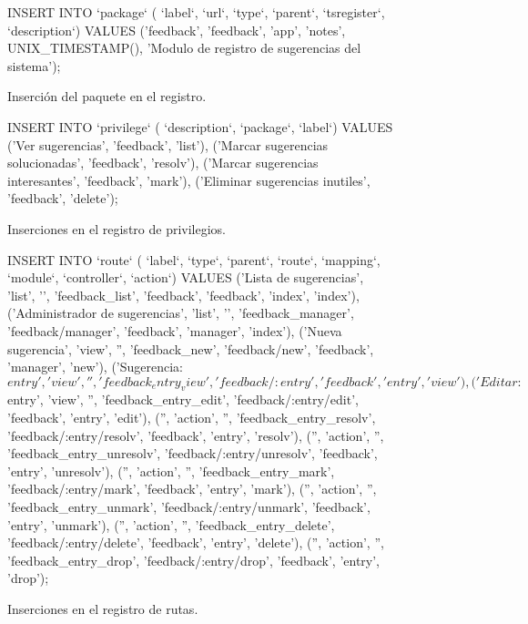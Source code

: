 \begin{figure}
\centering
\begin{SQL}
INSERT INTO `package` (
    `label`, `url`, `type`, `parent`,
    `tsregister`, `description`)
VALUES
    ('feedback', 'feedback', 'app', 'notes',
    UNIX_TIMESTAMP(),
   'Modulo de registro de sugerencias del sistema');
\end{SQL}
\caption{Inserción del paquete en el registro.}
\label{code2}
\end{figure}

\begin{figure}
\centering
\begin{SQL}
INSERT INTO `privilege` (
    `description`, `package`, `label`)
VALUES
    ('Ver sugerencias',                 'feedback', 'list'),
    ('Marcar sugerencias solucionadas', 'feedback', 'resolv'),
    ('Marcar sugerencias interesantes', 'feedback', 'mark'),
    ('Eliminar sugerencias inutiles',   'feedback', 'delete');
\end{SQL}
\caption{Inserciones en el registro de privilegios.}
\label{code3}
\end{figure}

\begin{figure}
\centering
\begin{SQL}
INSERT INTO `route` (
    `label`,
    `type`, `parent`, `route`,
    `mapping`,
    `module`, `controller`, `action`)
VALUES
    ('Lista de sugerencias',
     'list', '', 'feedback_list',
     'feedback',
     'feedback', 'index',   'index'),
    ('Administrador de sugerencias',
     'list', '', 'feedback_manager',
     'feedback/manager',
     'feedback', 'manager', 'index'),
    ('Nueva sugerencia',
     'view', '', 'feedback_new',
     'feedback/new',
     'feedback', 'manager', 'new'),
    ('Sugerencia: $entry',
     'view', '', 'feedback_entry_view',
     'feedback/:entry',
     'feedback', 'entry', 'view'),
    ('Editar: $entry',
     'view', '', 'feedback_entry_edit',
     'feedback/:entry/edit',
     'feedback', 'entry', 'edit'),
    ('', 'action', '', 'feedback_entry_resolv',
     'feedback/:entry/resolv',
     'feedback', 'entry', 'resolv'),
    ('', 'action', '', 'feedback_entry_unresolv',
     'feedback/:entry/unresolv',
     'feedback', 'entry', 'unresolv'),
    ('', 'action', '', 'feedback_entry_mark',
     'feedback/:entry/mark',
     'feedback', 'entry', 'mark'),
    ('', 'action', '', 'feedback_entry_unmark',
     'feedback/:entry/unmark',
     'feedback', 'entry', 'unmark'),
    ('', 'action', '', 'feedback_entry_delete',
     'feedback/:entry/delete',
     'feedback', 'entry', 'delete'),
    ('', 'action', '', 'feedback_entry_drop',
     'feedback/:entry/drop',
     'feedback', 'entry', 'drop');
\end{SQL}
\caption{Inserciones en el registro de rutas.}
\label{code4}
\end{figure}

